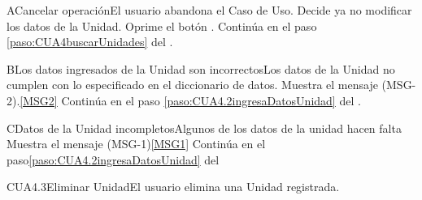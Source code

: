 		\begin{UCtrayectoriaA}{A}{Cancelar operación}{El usuario abandona el Caso de Uso.}
			\UCpaso[\UCactor] Decide ya no modificar los datos de la Unidad.
			\UCpaso[\UCactor] Oprime el botón .
			\UCpaso Continúa en el paso \ref{paso:CUA4buscarUnidades} del .
		\end{UCtrayectoriaA}
		\begin{UCtrayectoriaA}{B}{Los datos ingresados de la Unidad son incorrectos}{Los datos de la Unidad no cumplen con lo especificado en el diccionario de datos.}
			\UCpaso Muestra el mensaje (MSG-2).\ref{MSG2}
			\UCpaso Continúa en el paso \ref{paso:CUA4.2ingresaDatosUnidad} del .
		\end{UCtrayectoriaA}
		
		\begin{UCtrayectoriaA}{C}{Datos de la Unidad incompletos}{Algunos de los datos de la unidad hacen falta}
		 	\UCpaso Muestra el mensaje (MSG-1)\ref{MSG1}
			\UCpaso Continúa en el paso\ref{paso:CUA4.2ingresaDatosUnidad} del 
		\end{UCtrayectoriaA}






	\begin{UseCase}{CUA4.3}{Eliminar Unidad}{El usuario elimina una Unidad registrada.}
	\end{UseCase}

